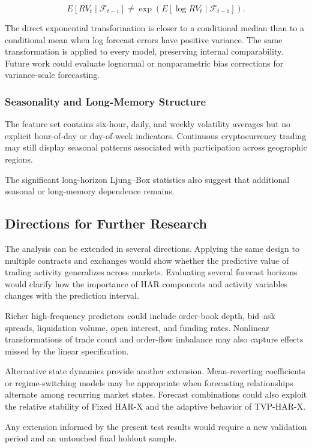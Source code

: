 \[
E
\left[
RV_t
\mid
\mathcal{F}_{t-1}
\right]
\neq
\exp
\left(
E
\left[
\log RV_t
\mid
\mathcal{F}_{t-1}
\right]
\right).
\]

The direct exponential transformation is closer to a
conditional median than to a conditional mean when log
forecast errors have positive variance. The same
transformation is applied to every model, preserving internal
comparability. Future work could evaluate lognormal or
nonparametric bias corrections for variance-scale forecasting.

\subsubsection{Seasonality and Long-Memory Structure}

The feature set contains six-hour, daily, and weekly volatility
averages but no explicit hour-of-day or day-of-week indicators.
Continuous cryptocurrency trading may still display seasonal
patterns associated with participation across geographic
regions.

The significant long-horizon Ljung--Box statistics also
suggest that additional seasonal or long-memory dependence
remains.

\subsection{Directions for Further Research}

The analysis can be extended in several directions. Applying
the same design to multiple contracts and exchanges would show
whether the predictive value of trading activity generalizes
across markets. Evaluating several forecast horizons would
clarify how the importance of HAR components and activity
variables changes with the prediction interval.

Richer high-frequency predictors could include order-book
depth, bid--ask spreads, liquidation volume, open interest, and
funding rates. Nonlinear transformations of trade count and
order-flow imbalance may also capture effects missed by the
linear specification.

Alternative state dynamics provide another extension.
Mean-reverting coefficients or regime-switching models may be
appropriate when forecasting relationships alternate among
recurring market states. Forecast combinations could also
exploit the relative stability of Fixed HAR-X and the adaptive
behavior of TVP-HAR-X.

Any extension informed by the present test results would
require a new validation period and an untouched final holdout
sample.